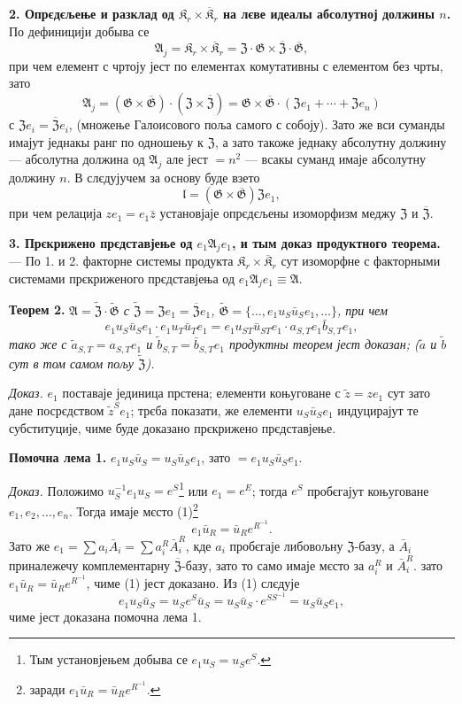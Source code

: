 \documentclass[11pt]{article}
\newcommand{\srcfn}[2]{\footnote{#2}}
\begin{document}
\noindent\textbf{2. Опрєдєљење и разклад од \(\mathfrak K_r\times\overline{\mathfrak K}_r\) на лєве идеалы абсолутној должины \(n\).} По дефиницији добыва се
\[
\mathfrak A_j=\mathfrak K_r\times\overline{\mathfrak K}_r
=\mathfrak Z\cdot\mathfrak G\times\overline{\mathfrak Z}\cdot\overline{\mathfrak G},
\]
при чем елемент с чртоју јест по елементах комутативны с елементом без чрты, зато
\[
\mathfrak A_j
=(\mathfrak G\times\overline{\mathfrak G})\cdot(\mathfrak Z\times\overline{\mathfrak Z})
=\mathfrak G\times\overline{\mathfrak G}\cdot(\mathfrak Ze_1+\cdots+\mathfrak Ze_n)
\]
с \(\mathfrak Ze_i=\overline{\mathfrak Z}e_i\), (множење Галоисового поља самого с собоју). Зато же вси суманды имајут једнакы ранг по одношењу к \(\mathfrak Z\), а зато такоже једнаку абсолутну должину --- абсолутна должина од \(\mathfrak A_j\) але јест \(=n^2\) --- всакы суманд имаје абсолутну должину \(n\). В слєдујучем за основу буде взето
\[
\mathfrak l=(\mathfrak G\times\overline{\mathfrak G})\mathfrak Ze_1,
\]
при чем релација \(ze_1=e_1\bar z\) установјаје опрєдєљены изоморфизм меджу \(\mathfrak Z\) и \(\overline{\mathfrak Z}\).

\noindent\textbf{3. Прєкрижено прєдставјење од \(e_1\mathfrak A_je_1\), и тым доказ продуктного теорема.} --- По 1. и 2. факторне системы продукта \(\mathfrak K_r\times\overline{\mathfrak K}_r\) сут изоморфне с факторными системами прєкриженого прєдставјења од \(e_1\mathfrak A_je_1\equiv\mathfrak A\).

\noindent\textbf{Теорем 2.} \emph{\(\mathfrak A=\widetilde{\mathfrak Z}\cdot\widetilde{\mathfrak G}\) с \(\widetilde{\mathfrak Z}=\mathfrak Ze_1=\overline{\mathfrak Z}e_1\), \(\widetilde{\mathfrak G}=\{\ldots,e_1u_S\bar u_Se_1,\ldots\}\), при чем
\[
e_1u_S\bar u_Se_1\cdot e_1u_T\bar u_Te_1
=e_1u_{ST}\bar u_{ST}e_1\cdot a_{S,T}e_1\bar b_{S,T}e_1,
\]
тако же с \(\tilde a_{S,T}=a_{S,T}e_1\) и \(\tilde b_{S,T}=\bar b_{S,T}e_1\) продуктны теорем јест доказан; (\(\tilde a\) и \(\tilde b\) сут в том самом пољу \(\widetilde{\mathfrak Z}\)).}

\noindent\emph{Доказ.} \(e_1\) поставаје јединица прстена; елементи коњуговане с \(\tilde z=ze_1\) сут зато дане посрєдством \(\tilde z^Se_1\); трєба показати, же елементи \(u_S\bar u_Se_1\) индуцирајут те субституције, чиме буде доказано прєкрижено прєдставјење.

\noindent\textbf{Помочна лема 1.} \(e_1u_S\bar u_S=u_S\bar u_Se_1\), зато \(=e_1u_S\bar u_Se_1\).

\noindent\emph{Доказ.} Положимо \(u_S^{-1}e_1u_S=e^S\)\srcfn{1}{Тым установјењем добыва се \(e_1u_S=u_Se^S\).} или \(e_1=e^E\); тогда \(e^S\) пробєгајут коњуговане \(e_1,e_2,\ldots,e_n\). Тогда имаје мєсто (1)\srcfn{2}{заради \(e_1\bar u_R=\bar u_Re^{R^{-1}}\).}
\[
e_1\bar u_R=\bar u_Re^{R^{-1}}.
\]
Зато же \(e_1=\sum a_i\bar A_i=\sum a_i^R\bar A_i^R\), кде \(a_i\) пробєгаје либовољну \(\mathfrak Z\)-базу, а \(\bar A_i\) приналежечу комплементарну \(\overline{\mathfrak Z}\)-базу, зато то само имаје мєсто за \(a_i^R\) и \(\bar A_i^R\). зато \(e_1\bar u_R=\bar u_Re^{R^{-1}}\), чиме (1) јест доказано. Из (1) слєдује
\[
e_1u_S\bar u_S=u_Se^S\bar u_S=u_S\bar u_S\cdot e^{SS^{-1}}=u_S\bar u_Se_1,
\]
чиме јест доказана помочна лема 1.
\end{document}
